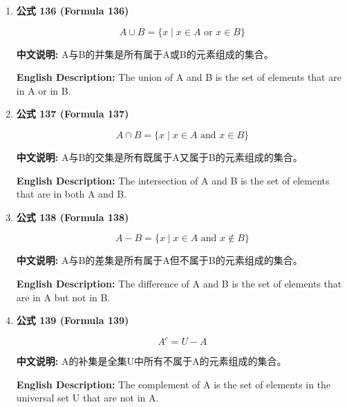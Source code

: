 \documentclass[12pt,a4paper]{article}
\begin{document}
\begin{enumerate}[leftmargin=*]
\vspace{0.5cm}

\item \textbf{公式 136 (Formula 136)}

\begin{equation}
A \cup B = \{x \mid x \in A \text{ or } x \in B\}
\end{equation}

\textbf{中文说明:} A与B的并集是所有属于A或B的元素组成的集合。

\textbf{English Description:} The union of A and B is the set of elements that are in A or in B.

\vspace{0.5cm}

\item \textbf{公式 137 (Formula 137)}

\begin{equation}
A \cap B = \{x \mid x \in A \text{ and } x \in B\}
\end{equation}

\textbf{中文说明:} A与B的交集是所有既属于A又属于B的元素组成的集合。

\textbf{English Description:} The intersection of A and B is the set of elements that are in both A and B.

\vspace{0.5cm}

\item \textbf{公式 138 (Formula 138)}

\begin{equation}
A - B = \{x \mid x \in A \text{ and } x \notin B\}
\end{equation}

\textbf{中文说明:} A与B的差集是所有属于A但不属于B的元素组成的集合。

\textbf{English Description:} The difference of A and B is the set of elements that are in A but not in B.

\vspace{0.5cm}

\item \textbf{公式 139 (Formula 139)}

\begin{equation}
A^c = U - A
\end{equation}

\textbf{中文说明:} A的补集是全集U中所有不属于A的元素组成的集合。

\textbf{English Description:} The complement of A is the set of elements in the universal set U that are not in A.


\end{enumerate}
\end{document}
